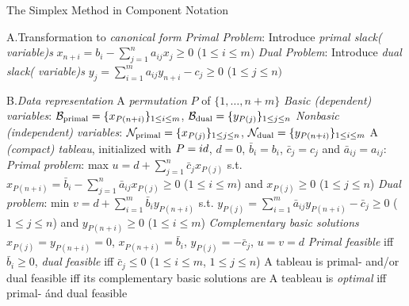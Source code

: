 \beginsection The Simplex Method in Component Notation

\item{A.}Transformation to \emph{canonical form}\smallskip
{}\emph{Primal Problem}: Introduce \emph{primal slack( variable)s}
$x_{n+i}=b_i-\sum_{j=1}^na_{ij}x_j\geq 0$ ($1\leq i\leq m)$\smallskip
{}\emph{Dual Problem}: Introduce \emph{dual slack( variable)s}
$y_{j}=\sum_{i=1}^ma_{ij}y_{n+i}-c_j\geq 0$ ($1\leq j\leq n)$\smallskip

\item{B.}\emph{Data representation}\smallskip
{}A \emph{permutation} $P$ of $\{1,\ldots,n+m\}$\smallskip
{}\emph{Basic (dependent) variables}: ${\cal B}_{\rm primal}=\{
x_{P(n+i)}\}_{1\leq i\leq m}$, ${\cal B}_{\rm dual}=\{ y_{P(j)}\}_{1\leq j\leq
n}$\smallskip
{}\emph{Nonbasic (independent) variables}: ${\cal N}_{\rm primal}=\{
x_{P(j)}\}_{1\leq j\leq n}$, ${\cal N}_{\rm dual}=\{ y_{P(n+i)}\}_{1\leq i\leq
m}$\smallskip
{}A \emph{(compact) tableau}, initialized with $P={\sl id}$, $d=0$,
$\bar{b}_i=b_i$, $\bar{c}_j=c_j$ and $\bar{a}_{ij}=a_{ij}$:\smallskip
\iitem{}\vbox{\offinterlineskip
}\smallskip
{}\emph{Primal problem}: max $u=d+\sum_{j=1}^n\bar{c}_jx_{P(j)}$ s.t.
$x_{P(n+i)}=\bar{b}_i-\sum_{j=1}^n\bar{a}_{ij}x_{P(j)}\geq 0$ ($1\leq i\leq m$)
and $x_{P(j)}\geq 0$ ($1\leq j\leq n$)\smallskip
{}\emph{Dual problem}: min
$v=d+\sum_{i=1}^m\bar{b}_iy_{P(n+i)}$ s.t.
$y_{P(j)}=\sum_{i=1}^m\bar{a}_{ij}y_{P(n+i)}-\bar{c}_j\geq 0$ ($1\leq j\leq n$)
and $y_{P(n+i)}\geq 0$ ($1\leq i\leq m$)\smallskip
{}\emph{Complementary basic solutions} $x_{P(j)}=y_{P(n+i)}=0$,
$x_{P(n+i)}=\bar{b}_i$, $y_{P(j)}=-\bar{c}_j$, $u=v=d$
\smallskip
{}\emph{Primal feasible} iff $\bar{b}_i\geq 0$, \emph{dual feasible}
iff $\bar{c}_j\leq 0$ ($1\leq i\leq m$,  $1\leq j\leq n$)\smallskip
{}A tableau is primal- and/or dual feasible iff its complementary
basic solutions are\smallskip
{}A teableau is \emph{optimal} iff primal- \'and dual feasible
\smallskip

